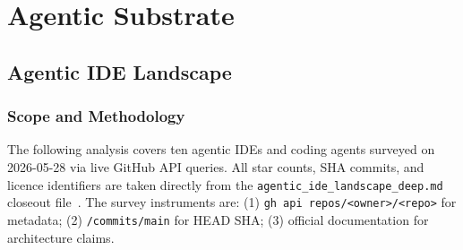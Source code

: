 
\chapter{Agentic Substrate}
\label{chap:agentic}

\begin{abstract}
  This chapter documents the agentic layer that sits above the runtime
  substrate described in Chapter~\ref{chap:runtime}.  We survey the agentic
  IDE landscape (\S\ref{sec:ide-landscape}), characterise Claude~Opus~4.8
  (\S\ref{sec:claude-opus}), specify the Model Context Protocol
  (\S\ref{sec:mcp}), describe the a11oy governance overlay
  (\S\ref{sec:a11oy}), analyse the AXPO Thinking-Acting Gap
  (\S\ref{sec:axpo}), audit ScientistOne CoE (\S\ref{sec:scientistone}),
  document Cursor Rules and DXT packaging (\S\ref{sec:cursor-rules}), and
  formalise the receipt chain over agentic actions (\S\ref{sec:receipt-agentic}).
  All benchmark figures are drawn from verified closeout files; no external
  benchmark claims are asserted without a verifiable source.
\end{abstract}

\section{Agentic IDE Landscape}
\label{sec:ide-landscape}

\subsection{Scope and Methodology}
\label{ssec:ide-scope}

The following analysis covers ten agentic IDEs and coding agents surveyed
on 2026-05-28 via live GitHub API queries.  All star counts, SHA commits,
and licence identifiers are taken directly from the \texttt{agentic\_ide\_landscape\_deep.md}
closeout file~\cite{agentic_ide_landscape_deep}.  The survey instruments are:
(1) \texttt{gh api repos/<owner>/<repo>} for metadata;
(2) \texttt{/commits/main} for HEAD SHA; (3) official documentation for
architecture claims.

